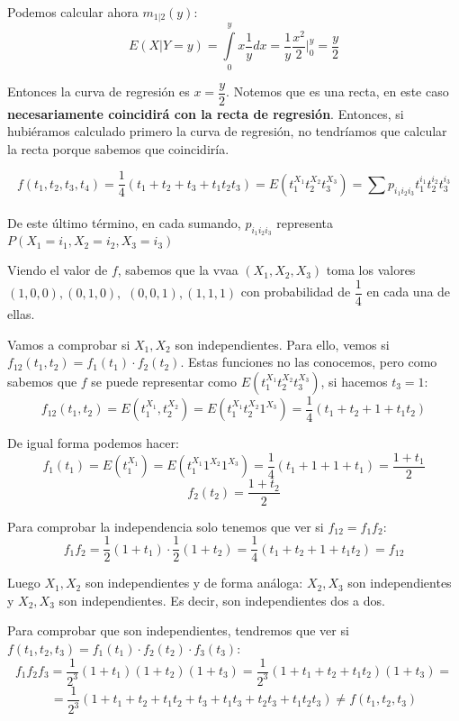 \documentclass[openany]{book}
\begin{document}
\begin{exercise}
    Podemos calcular ahora $ m_{1|2}(y) $:
    $$ E(X|Y=y) = \int\limits_{0}^{y}x \dfrac{1}{y} dx = \dfrac{1}{y}\dfrac{x^2}{2} \Biggr|_{0}^{y} = \dfrac{y}{2} $$

    Entonces la curva de regresión es $ x = \dfrac{y}{2} $. Notemos que es una recta, en este caso \textbf{necesariamente coincidirá con la recta de regresión}. Entonces, si hubiéramos calculado primero la curva de regresión, no tendríamos que calcular la recta porque sabemos que coincidiría.

    
\end{exercise}

\setcounter{ex}{1}

\begin{exercise}
    $$ f(t_1,t_2,t_3,t_4) = \dfrac{1}{4}(t_1+t_2+t_3+t_1t_2t_3) = E(t_1^{X_1}t_2^{X_2}t_3^{X_3}) = \sum\limits_{}^{}p_{i_1i_2i_3}t_1^{i_1}t_2^{i_2}t_3^{i_3} $$

    De este último término, en cada sumando, $ p_{i_1i_2i_3} $ representa $ P(X_1=i_1,X_2=i_2,X_3=i_3) $

    Viendo el valor de $ f $, sabemos que la vvaa $ (X_1,X_2,X_3) $ toma los valores $ (1,0,0),(0,1,0),$  $(0,0,1),(1,1,1) $ con probabilidad de $ \dfrac{1}{4} $ en cada una de ellas.

    Vamos a comprobar si $ X_1,X_2 $ son independientes. Para ello, vemos si $ f_{12}(t_1,t_2) = f_{1}(t_1) \cdot f_{2}(t_2) $. Estas funciones no las conocemos, pero como sabemos que $ f $ se puede representar como $ E(t_1^{X_1}t_2^{X_2}t_3^{X_3}) $, si hacemos $ t_3=1 $:
    $$ f_{12}(t_1,t_2) = E(t_1^{X_1},t_2^{X_2}) = E(t_1^{X_1}t_2^{X_2}1^{X_3}) = \dfrac{1}{4}(t_1+t_2+1+t_1t_2) $$
    
    De igual forma podemos hacer:
    $$ f_{1}(t_1) = E(t_1^{X_1}) = E(t_1^{X_1}1^{X_2}1^{X_3}) = \dfrac{1}{4}(t_1+1+1+t_1) = \dfrac{1+t_1}{2} $$
    $$ f_{2}(t_2) = \dfrac{1+t_2}{2} $$

    Para comprobar la independencia solo tenemos que ver si $ f_{12} = f_{1}f_{2} $:
    $$f_{1}f_{2} = \dfrac{1}{2}(1+t_1) \cdot \dfrac{1}{2}(1+t_2) = \dfrac{1}{4}(t_1+t_2+1+t_1t_2) = f_{12} $$

    Luego $ X_1,X_2 $ son independientes y de forma análoga: $ X_2,X_3 $ son independientes y $ X_2,X_3 $ son independientes. Es decir, son independientes dos a dos.
    
    Para comprobar que son independientes, tendremos que ver si $ f(t_1,t_2,t_3) = f_{1}(t_1) \cdot f_{2}(t_2)\cdot f_{3}(t_3) $:
    $$ f_{1}f_{2}f_{3} = \dfrac{1}{2^3}(1+t_1)(1+t_2)(1+t_3) = \dfrac{1}{2^3}(1+t_1+t_2+t_1t_2)(1+t_3)= $$
    $$ = \dfrac{1}{2^3}(1+t_1+t_2+t_1t_2+t_3+t_1t_3+t_2t_3+t_1t_2t_3) \ne f(t_1,t_2,t_3) $$


\end{exercise}
\end{document}

